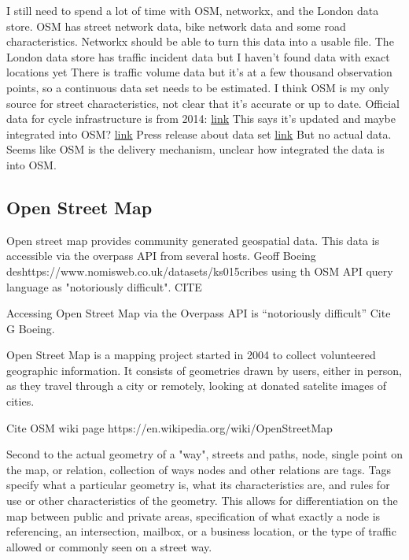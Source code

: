 I still need to spend a lot of time with OSM, networkx, and the London data store. 
OSM has street network data, bike network data and some road characteristics. 
Networkx should be able to turn this data into a usable file. 
The London data store has traffic incident data but I haven't found data with exact locations yet
There is traffic volume data but it's at a few thousand observation points, so a continuous data set needs to be estimated. 
I think OSM is my only source for street characteristics, not clear that it's accurate or up to date.
Official data for cycle infrastructure is from 2014: \href{https://data.gov.uk/dataset/47f0a282-3356-4530-8e7b-f67aaf4bec63/cycle-routes}{link}
This says it's updated and maybe integrated into OSM? \href{https://www.cyclestreets.net/blog/category/open-data/}{link}
Press release about data set \href{https://www.london.gov.uk/press-releases/mayoral/action-plan-to-get-more-londoners-cycling}{link}
But no actual data. Seems like OSM is the delivery mechanism, unclear how integrated the data is into OSM. 


\subsection{Open Street Map}


Open street map provides community generated geospatial data. This data is accessible via the overpass API from several hosts. 
Geoff Boeing deshttps://www.nomisweb.co.uk/datasets/ks015cribes using th OSM API query language as "notoriously difficult". CITE

Accessing Open Street Map via the Overpass API is ``notoriously difficult'' Cite G Boeing. 

Open Street Map is a mapping project started in 2004 to collect volunteered geographic information. It consists of geometries drawn by users, either in person, as they travel through a city or remotely, looking at donated satelite images of cities. 

Cite OSM wiki page
https://en.wikipedia.org/wiki/OpenStreetMap

Second to the actual geometry of a "way", streets and paths, node, single point on the map, or relation, collection of ways nodes and other relations are tags. Tags specify what a particular geometry is, what its characteristics are, and rules for use or other characteristics of the geometry. This allows for differentiation on the map between public and private areas, specification of what exactly a node is referencing, an intersection, mailbox, or a business location, or the type of traffic allowed or commonly seen on a street way. 

